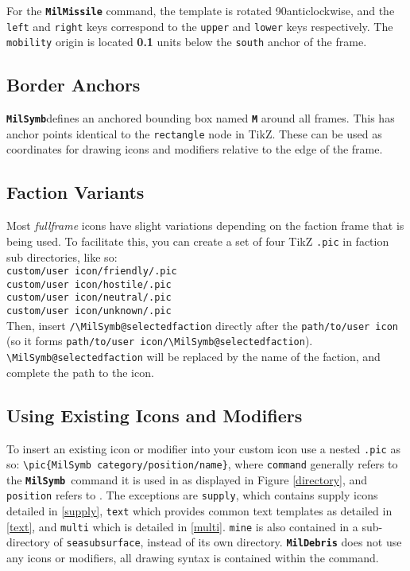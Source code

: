 \documentclass[a4paper, titlepage]{article}
\newcommand\MilSymb{\textbf{\texttt{MilSymb}}}
\begin{document}
For the \texttt{\textbf{MilMissile}} command, the template is rotated 90\textdegree anticlockwise, and the \texttt{left} and \texttt{right} keys correspond to the \texttt{upper} and \texttt{lower} keys respectively. The \texttt{mobility} origin is located \textbf{0.1} units below the \texttt{south} anchor of the frame.

\subsection{Border Anchors}

\MilSymb defines an anchored bounding box named \textbf{\texttt{M}} around all frames. This has anchor points identical to the \texttt{rectangle} node in TikZ. These can be used as coordinates for drawing icons and modifiers relative to the edge of the frame.

\subsection{Faction Variants}

Most \textit{fullframe} icons have slight variations depending on the faction frame that is being used. To facilitate this, you can create a set of four TikZ \texttt{.pic} in faction sub directories, like so:\\

\noindent\texttt{custom/user icon/friendly/.pic}\\
\texttt{custom/user icon/hostile/.pic}\\
\texttt{custom/user icon/neutral/.pic}\\
\texttt{custom/user icon/unknown/.pic}\\

Then, insert \texttt{/\textbackslash MilSymb@selectedfaction} directly after the \texttt{path/to/user icon} (so it forms \texttt{path/to/user icon/\textbackslash MilSymb@selectedfaction}). \texttt{\textbackslash MilSymb@selectedfaction} will be replaced by the name of the faction, and complete the path to the icon.

\subsection{Using Existing Icons and Modifiers}

To insert an existing icon or modifier into your custom icon use a nested \texttt{.pic} as so: \texttt{\textbackslash pic\{MilSymb category/position/name\}}, where \texttt{command} generally refers to the \MilSymb\  command it is used in as displayed in Figure \ref{directory}, and \texttt{position} refers to . The exceptions are \texttt{supply}, which contains supply icons detailed in \ref{supply}, \texttt{text} which provides common text templates as detailed in \ref{text}, and \texttt{multi} which is detailed in \ref{multi}. \texttt{mine} is also contained in a sub-directory of \texttt{seasubsurface}, instead of its own directory. \texttt{\textbf{MilDebris}} does not use any icons or modifiers, all drawing syntax is contained within the command.
\end{document}
